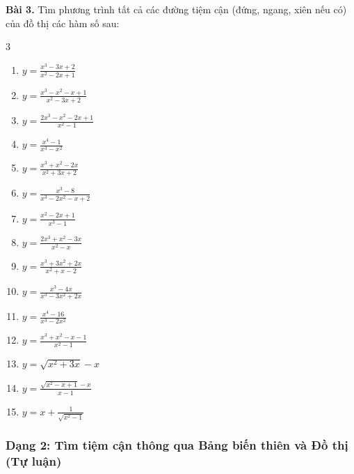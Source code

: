 \documentclass[12pt]{article}
\begin{document}
	\begin{btdo}
		\noindent \textbf{Bài 3.} Tìm phương trình tất cả các đường tiệm cận (đứng, ngang, xiên nếu có) của đồ thị các hàm số sau:
		\begin{multicols}{3}
			\begin{enumerate}[label=\textbf{\arabic*)}]
				\item $y = \frac{x^3 - 3x + 2}{x^2 - 2x + 1}$
				\item $y = \frac{x^3 - x^2 - x + 1}{x^2 - 3x + 2}$
				\item $y = \frac{2x^3 - x^2 - 2x + 1}{x^2 - 1}$
				\item $y = \frac{x^4 - 1}{x^3 - x^2}$
				\item $y = \frac{x^3 + x^2 - 2x}{x^2 + 3x + 2}$
				\item $y = \frac{x^3 - 8}{x^3 - 2x^2 - x + 2}$
				\item $y = \frac{x^2 - 2x + 1}{x^3 - 1}$
				\item $y = \frac{2x^3 + x^2 - 3x}{x^2 - x}$
				\item $y = \frac{x^3 + 3x^2 + 2x}{x^2 + x - 2}$
				\item $y = \frac{x^3 - 4x}{x^3 - 3x^2 + 2x}$
				\item $y = \frac{x^4 - 16}{x^3 - 2x^2}$
				\item $y = \frac{x^3 + x^2 - x - 1}{x^2 - 1}$
				\item $y = \sqrt{x^2 + 3x} - x$
				\item $y = \frac{\sqrt{x^2 - x + 1} - x}{x - 1}$
				\item $y = x + \frac{1}{\sqrt{x^2 - 1}}$
			\end{enumerate}
		\end{multicols}
	\end{btdo}
	
	\subsubsection{Dạng 2: Tìm tiệm cận thông qua Bảng biến thiên và Đồ thị (Tự luận)}
	
\end{document}

